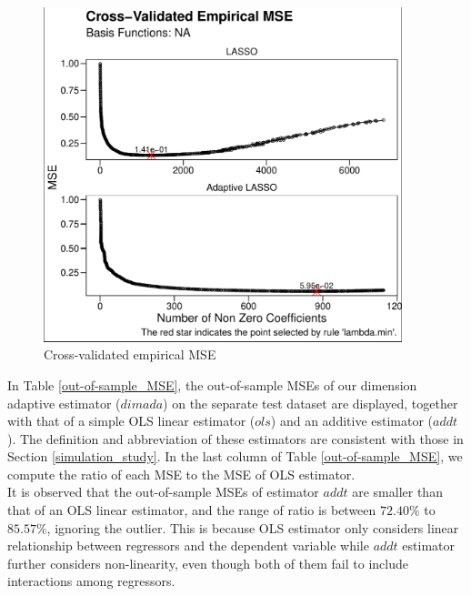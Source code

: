 \documentclass[12pt, a4paper]{article}
\theoremstyle{MAstyle} \newtheorem{assumption}{Assumption}[section]
\theoremstyle{MAstyle} \newtheorem{definition}{Definition}[section]
\theoremstyle{MAstyle} \newtheorem{theorem}{Theorem}[section]
\theoremstyle{MAstyle} \newtheorem{corollary}{Corollary}[section]
\begin{document}
            \begin{figure}[H] \centering
		      \includegraphics[width = 0.93\textwidth,trim= {{0.01\textwidth} {0.087\textwidth} {0.001\textwidth} {0.12\textwidth}}, clip=true]{Graphics/dimada.trig.plot.pdf}
		      \caption{Cross-validated empirical MSE}
		      \label{dimada.trig.plot}
	    \end{figure}

            In Table \ref{out-of-sample_MSE}, the out-of-sample MSEs of our dimension adaptive estimator ($dimada$) on the separate test dataset are displayed, together with that of a simple OLS linear estimator ($ols$) and an additive estimator ($addt$). The definition and abbreviation of these estimators are consistent with those in Section \ref{simulation_study}. In the last column of Table \ref{out-of-sample_MSE}, we compute the ratio of each MSE to the MSE of OLS estimator.\\

            It is observed that the out-of-sample MSEs of estimator $addt$ are smaller than that of an OLS linear estimator, and the range of ratio is between $72.40\%$ to $85.57\%$, ignoring the outlier. This is because OLS estimator only considers linear relationship between regressors and the dependent variable while $addt$ estimator further considers non-linearity, even though both of them fail to include interactions among regressors.\\
\end{document}

